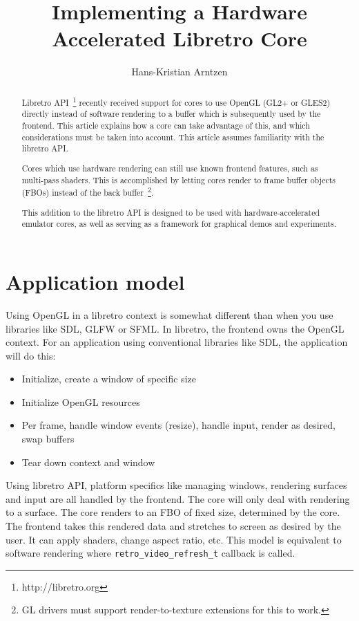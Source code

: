 \documentclass[11pt]{article}
\author{Hans-Kristian Arntzen}
\title{Implementing a Hardware Accelerated Libretro Core}
\begin{document}
\maketitle

\begin{abstract}
Libretro API~\footnote{http://libretro.org} recently received support for cores to use OpenGL (GL2+ or GLES2) directly instead of software rendering to a buffer which is subsequently used by the frontend. This article explains how a core can take advantage of this, and which considerations must be taken into account. This article assumes familiarity with the libretro API.

Cores which use hardware rendering can still use known frontend features, such as multi-pass shaders.
This is accomplished by letting cores render to frame buffer objects (FBOs) instead of the back buffer~\footnote{GL drivers must support render-to-texture extensions for this to work.}.

This addition to the libretro API is designed to be used with hardware-accelerated emulator cores, as well as serving as a framework for graphical demos and experiments.
\end{abstract}

\section*{Application model}
Using OpenGL in a libretro context is somewhat different than when you use libraries like SDL, GLFW or SFML. In libretro, the frontend owns the OpenGL context. For an application using conventional libraries like SDL, the application will do this:

\begin{itemize}
\item Initialize, create a window of specific size
\item Initialize OpenGL resources
\item Per frame, handle window events (resize), handle input, render as desired, swap buffers
\item Tear down context and window
\end{itemize}

Using libretro API, platform specifics like managing windows, rendering surfaces and input are all handled by the frontend. The core will only deal with rendering to a surface. The core renders to an FBO of fixed size, determined by the core. The frontend takes this rendered data and stretches to screen as desired by the user. It can apply shaders, change aspect ratio, etc. This model is equivalent to software rendering where \texttt{retro\_video\_refresh\_t} callback is called.
\end{document}
